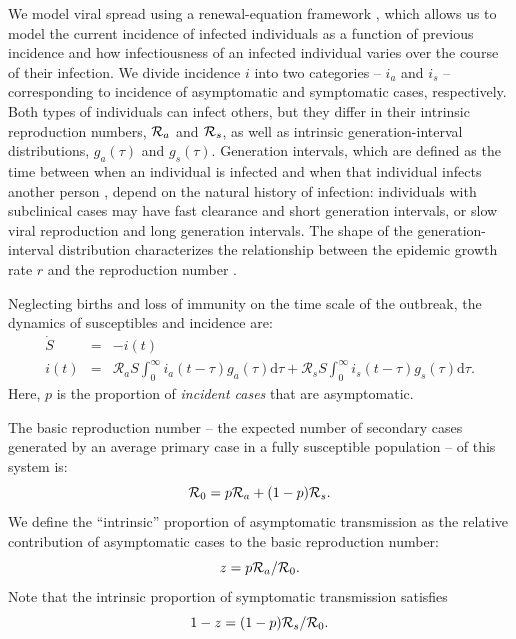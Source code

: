 We model viral spread using a renewal-equation framework \citep{heesterbeek1996concept}, which allows us to model the current incidence of infected individuals as a function of previous incidence and how infectiousness of an infected individual varies over the course of their infection.
We divide incidence $i$ into two categories -- $i_a$ and $i_s$ -- corresponding to incidence of asymptomatic and symptomatic cases, respectively.
Both types of individuals can infect others, but they differ in their intrinsic reproduction numbers, ${\cal{R}}_a$ and ${\cal{R}}_s$, as well as intrinsic generation-interval distributions, $g_a(\tau)$ and $g_s(\tau)$.
Generation intervals, which are defined as the time between when an individual is infected and when that individual infects another person \citep{svensson2007note}, depend on the natural history of infection:
individuals with subclinical cases may have fast clearance and short generation intervals, or slow viral reproduction and long generation intervals.
The shape of the generation-interval distribution characterizes the relationship between the epidemic growth rate $r$ and the reproduction number \citep{wallinga2007generation}.

Neglecting births and loss of immunity on the time scale of the outbreak, the dynamics of susceptibles and incidence are:
\begin{eqnarray}
\dot{S}&=&-i(t) \\
i(t)&=&\mathcal R_a S \int_0^\infty i_a(t-\tau) g_a(\tau) \mathrm{d}\tau + \mathcal R_s S \int_0^\infty i_s(t-\tau) g_s(\tau) \mathrm{d}\tau.
\end{eqnarray}
Here, $p$ is the proportion of \emph{incident cases} that are asymptomatic.

The basic reproduction number -- the expected number of secondary cases generated by an average primary case in a fully susceptible population \citep{anderson1992infectious} -- of this system is:
\begin{equation}
{\cal{R}}_{0}= p {\cal{R}}_a + (1-p) {\cal{R}}_s.
\end{equation}
We define the ``intrinsic'' proportion of asymptomatic transmission as the relative contribution of asymptomatic cases to the basic reproduction number:
\begin{equation}
z = p {\cal{R}}_a/{\cal{R}}_{0}.
\end{equation}
Note that the intrinsic proportion of symptomatic transmission satisfies
\begin{equation}
1-z = (1-p) {\cal{R}}_s/{\cal{R}}_{0}.
\end{equation}

